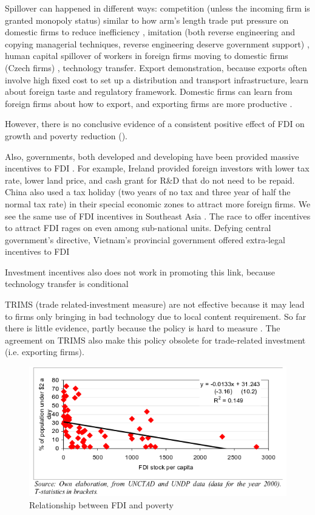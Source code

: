\documentclass[12pt]{article}
\begin{document}
Spillover can happened in different ways: competition (unless the incoming firm is granted monopoly status) similar to how arm's length trade put pressure on domestic firms to reduce inefficiency \citep{Glass2002}, imitation (both reverse engineering and copying managerial techniques, reverse engineering deserve government support) \citep{Wang1992}, human capital spillover of workers in foreign firms moving to domestic firms (Czech firms) \citep{Djankov2000}, technology transfer. Export demonstration, because exports often involve high fixed cost to set up a distribution and transport infrastructure, learn about foreign taste and regulatory framework. Domestic firms can learn from foreign firms about how to export, and exporting firms are more productive \citep{Aitken1997}.

However, there is no conclusive evidence of a consistent positive effect of FDI on growth and poverty reduction \citep{Guerra2009} ().

Also, governments, both developed and developing have been provided massive incentives to FDI \citep{Telford2001}. For example, Ireland provided foreign investors with lower tax rate, lower land price, and cash grant for R\&D that do not need to be repaid. China also used a tax holiday (two years of no tax and three year of half the normal tax rate) in their special economic zones to attract more foreign firms. We see the same use of FDI incentives in Southeast Asia \citep{Fletcher2002}. The race to offer incentives to attract FDI rages on even among sub-national units. Defying central government's directive, Vietnam's provincial government offered extra-legal incentives to FDI \citep{Vu2007}

Investment incentives also does not work in promoting this link, because technology transfer is conditional \citep{Blomstrom2002}

TRIMS (trade related-investment measure) are not effective because it may lead to firms only bringing in bad technology due to local content requirement. So far there is little evidence, partly because the policy is hard to measure \citep{Greenaway1992}. The agreement on TRIMS also make this policy obsolete for trade-related investment (i.e. exporting firms).



\begin{figure}[!ht]
\includegraphics[width=\textwidth, height=\textheight,keepaspectratio]{../figure/fdi_poverty}
\caption{Relationship between FDI and poverty}
\label{fig:fdipoverty}
\end{figure}
\end{document}
